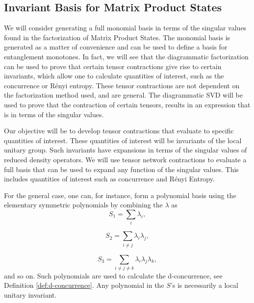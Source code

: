 \subsection*{Invariant Basis for Matrix Product States}\label{sec:monomial-mps}

We will consider generating a full monomial basis in terms of the singular values found in the factorization of Matrix Product States.  The monomial basis is generated as a matter of convenience and can be used to define a basis for entanglement monotones.   In fact, we will see that the diagrammatic factorization can be used to prove that certain tensor contractions give rise to certain invariants, which allow one to calculate quantities of interest, such as the concurrence or R\'{e}nyi entropy.  These tensor contractions are not dependent on the factorization method used, and are general. The diagrammatic SVD will be used to prove that the contraction of certain tensors, results in an expression that is in terms of the singular values.  

Our objective will be to develop tensor contractions that evaluate to specific quantities of interest.  These quantities of interest will be invariants of the local unitary group.  
Such invariants have expansions in terms of the singular values of reduced density operators.  We will use tensor network contractions to evaluate a full basis that can be used to expand any 
function of the singular values.  This includes quantities of interest such as concurrence and R\'{e}nyi Entropy.  

For the general case, one can, for instance, form a polynomial basis using the elementary symmetric polynomials by combining the $\lambda$ as   
\begin{equation}
 S_1 = \sum_i \lambda_i,
\end{equation}

\begin{equation}
 S_2 = \sum_{i\neq j} \lambda_i\lambda_j,
\end{equation}

\begin{equation}
 S_3 = \sum_{i\neq j\neq k} \lambda_i\lambda_j\lambda_k, 
\end{equation}
and so on.  Such polynomials are used to calculate the d-concurrence, see Definition \ref{def:d-concurrence}.  
Any polynomial in the $S$'s is necessarily a local unitary invariant.  

